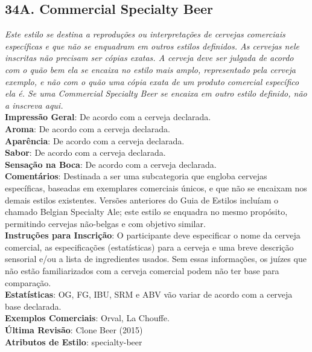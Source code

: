 \subsection*{34A. Commercial Specialty Beer}
\textit{Este estilo se destina a reproduções ou interpretações de cervejas comerciais específicas e que não se enquadram em outros estilos definidos. As cervejas nele inscritas não precisam ser cópias exatas. A cerveja deve ser julgada de acordo com o quão bem ela se encaixa no estilo mais amplo, representado pela cerveja exemplo, e não com o quão uma cópia exata de um produto comercial específico ela é. Se uma Commercial Specialty Beer se encaixa em outro estilo definido, não a inscreva aqui.}\\
\textbf{Impressão Geral}: De acordo com a cerveja declarada. \\
\textbf{Aroma}: De acordo com a cerveja declarada. \\
\textbf{Aparência}: De acordo com a cerveja declarada. \\
\textbf{Sabor}: De acordo com a cerveja declarada. \\
\textbf{Sensação na Boca}: De acordo com a cerveja declarada. \\
\textbf{Comentários}: Destinada a ser uma subcategoria que engloba cervejas específicas, baseadas em exemplares comerciais únicos, e que não se encaixam nos demais estilos existentes. Versões anteriores do Guia de Estilos incluíam o chamado Belgian Specialty Ale; este estilo se enquadra no mesmo propósito, permitindo cervejas não-belgas e com objetivo similar. \\
\textbf{Instruções para Inscrição}: O participante deve especificar o nome da cerveja comercial, as especificações (estatísticas) para a cerveja e uma breve descrição sensorial e/ou a lista de ingredientes usados. Sem essas informações, os juízes que não estão familiarizados com a cerveja comercial podem não ter base para comparação. \\
\textbf{Estatísticas}: OG, FG, IBU, SRM e ABV vão variar de acordo com a cerveja base declarada. \\
\textbf{Exemplos Comerciais}: Orval, La Chouffe. \\
\textbf{Última Revisão}: Clone Beer (2015) \\
\textbf{Atributos de Estilo}: specialty-beer

